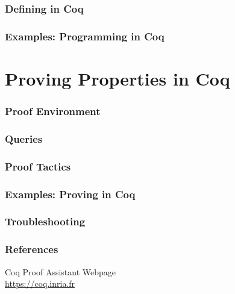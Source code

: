 \documentclass{article}
\begin{document}
\newpage
\section{Defining in Coq}
	\label{Sec: defining}
	

\newpage
\section{Examples: Programming in Coq}
	\label{Sec: program examples}
	


\newpage
\part{Proving Properties in Coq}
	\label{Part: prove}
\section{Proof Environment}
	\label{Sec: env}
	


\newpage
\section{Queries}
	\label{Sec: queries}
	


\newpage
\section{Proof Tactics}
	\label{Sec: tactics}
	


\newpage
\section{Examples: Proving in Coq}
	\label{Sec: proof examples}
	



\newpage
\section{Troubleshooting}
	\label{Sec: troubleshooting}
	



\newpage
\section{References}
	\label{Sec: refs}

Coq Proof Assistant Webpage 		\\
\url{https://coq.inria.fr}
\end{document}
